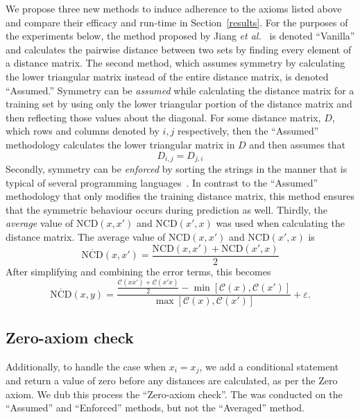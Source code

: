 \documentclass[preprint,12pt]{article}
\begin{document}
We propose three new methods to induce adherence to the axioms listed above and compare their efficacy and run-time in Section~\ref{results}.
For the purposes of the experiments below, the method proposed by Jiang \textit{et al.}~\cite{jiang2022less} is denoted ``Vanilla'' and calculates the pairwise distance between two sets by finding every element of a distance matrix. 
The second method, which assumes symmetry by calculating the lower triangular matrix instead of the entire distance matrix, is denoted ``Assumed.''
Symmetry can be \textit{assumed} while calculating the distance matrix for a training set by using only the lower triangular portion of the distance matrix and then reflecting those values about the diagonal.
For some distance matrix, $D$, which rows and columns denoted by $i,j$ respectively, then the ``Assumed'' methodology calculates the lower triangular matrix in $D$ and then assumes that 
\begin{equation}
    D_{i,j} = D_{j,i}
    \label{eq:assumed}
\end{equation}
Secondly, symmetry can be \textit{enforced} by sorting the strings in the manner that is typical of several programming languages~\cite{}.
In contrast to the ``Assumed'' methodology that only modifies the training distance matrix, this method ensures that the symmetric behaviour occurs during prediction as well.
Thirdly, the \textit{average} value of $\text{NCD}(x,x')$ and $\text{NCD}(x',x)$ was used when calculating the distance matrix.
The average value of $\text{NCD}(x,x')$ and $\text{NCD}(x',x)$ is
$$
    \overline{\text{NCD}}(x,x') = \frac{\text{NCD}(x,x') + \text{NCD}(x', x)}{2}
$$
After simplifying and combining the error terms, this becomes
\begin{equation}
    \overline{\text{NCD}}(x, y) = \frac{\frac{\mathcal{C}(xx') + \mathcal{C}(x'x)}{2} - \min[\mathcal{C}(x), \mathcal{C}(x')]}{\max[\mathcal{C}(x), \mathcal{C}(x')]} + \varepsilon.
\end{equation}

\subsection{Zero-axiom check }
Additionally, to handle the case when $x_i = x_j$, we add a conditional statement and return a value of zero before any distances are calculated, as per the Zero axiom. 
We dub this process the ``Zero-axiom check''. 
The was conducted on the ``Assumed'' and ``Enforced'' methods, but not the ``Averaged'' method.
\end{document}

